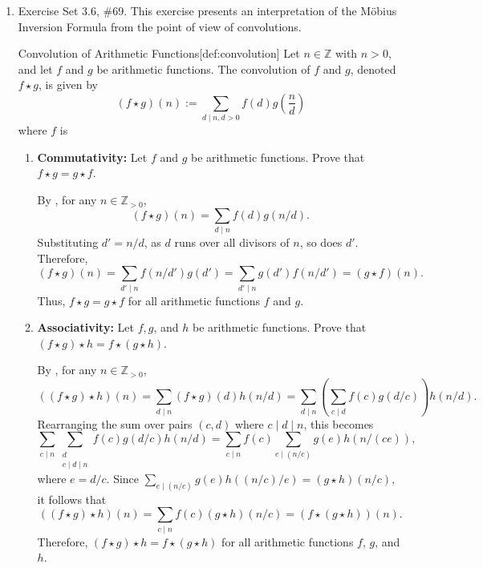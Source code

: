 \begin{enumerate}
  \newpage

  \item Exercise Set 3.6, \#69. This exercise presents an interpretation of the Möbius Inversion Formula from the point of view of convolutions.
  \begin{define}{Convolution of Arithmetic Functions}[def:convolution]
  Let $n \in \mathbb{Z}$ with $n>0$, and let $f$ and $g$ be arithmetic functions. The convolution of $f$ and $g$, denoted $f \star g$, is given by
  \[
  (f \star g)(n):=\sum_{d \mid n, d>0} f(d) g\left(\frac{n}{d}\right)
  \]
  where $f$ is 
  \end{define}
  \begin{enumerate}
    \item \textbf{Commutativity:} Let $f$ and $g$ be arithmetic functions. Prove that $f \star g=g \star f$.
    \begin{subprove}
      By , for any $n \in \mathbb{Z}_{>0}$,
      \[
      (f \star g)(n) = \sum_{d \mid n} f(d) g(n/d).
      \]
      Substituting $d' = n/d$, as $d$ runs over all divisors of $n$, so does $d'$. Therefore,
      \[
      (f \star g)(n) = \sum_{d' \mid n} f(n/d') g(d') = \sum_{d' \mid n} g(d') f(n/d') = (g \star f)(n).
      \]
      Thus, $f \star g = g \star f$ for all arithmetic functions $f$ and $g$.
    \end{subprove}

    \item \textbf{Associativity:} Let $f, g$, and $h$ be arithmetic functions. Prove that $(f \star g) \star h= f \star(g \star h)$.
    \begin{subprove}
      By , for any $n \in \mathbb{Z}_{>0}$,
      \[
      ((f \star g) \star h)(n) = \sum_{d \mid n} (f \star g)(d) h(n/d) = \sum_{d \mid n} \left(\sum_{c \mid d} f(c) g(d/c)\right) h(n/d).
      \]
      Rearranging the sum over pairs $(c,d)$ where $c \mid d \mid n$, this becomes
      \[
      \sum_{c \mid n} \sum_{\substack{d\\ c \mid d \mid n}} f(c) g(d/c) h(n/d) = \sum_{c \mid n} f(c) \sum_{e \mid (n/c)} g(e) h(n/(ce)),
      \]
      where $e = d/c$. Since $\sum_{e \mid (n/c)} g(e) h((n/c)/e) = (g \star h)(n/c)$, it follows that
      \[
      ((f \star g) \star h)(n) = \sum_{c \mid n} f(c) (g \star h)(n/c) = (f \star (g \star h))(n).
      \]
      Therefore, $(f \star g) \star h = f \star (g \star h)$ for all arithmetic functions $f$, $g$, and $h$.
    \end{subprove}


\end{enumerate}
\end{enumerate}
